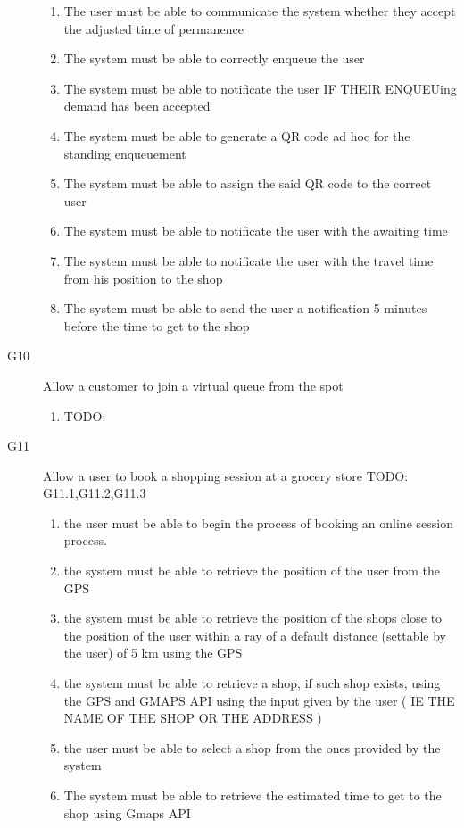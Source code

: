 \begin{description}
\begin{enumerate}[resume*]
            \item The user must be able to communicate the system whether they accept the adjusted time of permanence
            \item The system must be able to correctly enqueue the user
            \item The system must be able to notificate the user IF THEIR ENQUEUing demand has been accepted
            \item The system must be able to generate a QR code ad hoc for the standing enqueuement
            \item The system must be able to assign the said QR code to the correct user
            \item The system must be able to notificate the user with the awaiting time 
            \item The system must be able to notificate the user with the travel time from his position to the shop 
            \item The system must be able to send the user a notification 5 minutes before the time to get to the shop 
        \end{enumerate}
    \item [G10] Allow a customer to join a virtual queue from the spot
        \begin{enumerate}[resume*]
            \item TODO:
        \end{enumerate}
    \item [G11] Allow a user to book a shopping session at a grocery store TODO: G11.1,G11.2,G11.3
        \begin{enumerate}[resume*]
            \item the user must be able to begin the process of  booking an online session process.
            \item the system must be able to retrieve the position of the user from the GPS
            \item the system must be able to retrieve the position of the shops close to the position of the user within a ray of a default distance (settable by the user) of 5 km using the GPS
            \item the system must be able to retrieve a shop, if such shop exists, using the GPS  and GMAPS API using the input given by the user ( IE THE NAME OF THE SHOP OR THE ADDRESS )
            \item the user must be able to select a shop from the ones provided by the system
            \item The system must be able to retrieve the estimated time to get to the shop using Gmaps API

\end{enumerate}
\end{description}
